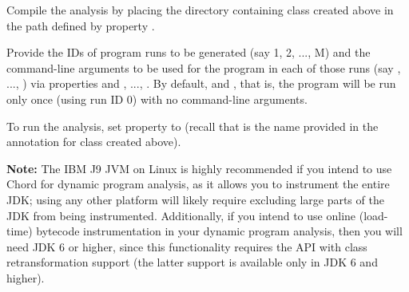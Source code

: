 Compile the analysis by placing the directory containing class  created
above in the path defined by property .

Provide the IDs of program runs to be generated (say 1, 2, ..., M) and the command-line arguments to be
used for the program in each of those runs (say , ..., ) via properties
 and , ..., .
By default,  and , that is, the program will be run only
once (using run ID 0) with no command-line arguments.

To run the analysis, set property  to 
(recall that  is the name provided in the  annotation for class
 created above).

{\bf Note:} The IBM J9 JVM on Linux is highly recommended if you intend to use Chord for
dynamic program analysis, as it allows you to instrument the entire JDK; using any other
platform will likely require excluding large parts of the JDK from being instrumented.
Additionally, if you intend to use online (load-time) bytecode instrumentation in
your dynamic program analysis, then you will need JDK 6 or higher, since this functionality
requires the  API with class retransformation support (the latter
support is available only in JDK 6 and higher).


